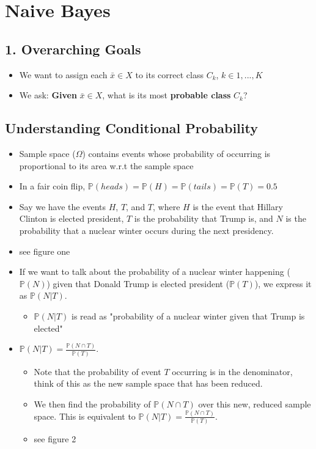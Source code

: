 \documentclass{article}
\author{Nelson Liu}
\date{\today}
\title{}
\begin{document}
\tableofcontents

\section{Naive Bayes}
\label{sec:orgheadline5}
\subsection{1. Overarching Goals}
\label{sec:orgheadline1}
\begin{itemize}
\item We want to assign each \(\bar{x} \in X\) to its correct class \(C_k\), \(k \in
  {1,...,K}\)
\item We ask: \textbf{Given} \(\bar{x} \in X\), what is its most \textbf{probable class} \(C_k\)?
\end{itemize}
\subsection{Understanding Conditional Probability}
\label{sec:orgheadline2}
\begin{itemize}
\item Sample space (\(\Omega\)) contains events whose probability of occurring is proportional to
its area w.r.t the sample space
\item In a fair coin flip, \(\mathbb{P}(heads) = \mathbb{P}(H) = \mathbb{P}(tails) = \mathbb{P}(T) = 0.5\)
\item Say we have the events \(H\), \(T\), and \(T\), where \(H\) is the event that Hillary
Clinton is elected president, \(T\) is the probability that Trump is, and \(N\) is
the probability that a nuclear winter occurs during the next presidency.
\item see figure one
\item If we want to talk about the probability of a nuclear winter happening
(\(\mathbb{P}(N)\)) given that Donald Trump is elected president
(\(\mathbb{P}(T)\)), we express it as \(\mathbb{P}(N|T)\).
\begin{itemize}
\item \(\mathbb{P}(N|T)\) is read as "probability of a nuclear winter given that Trump is
elected"
\end{itemize}
\item \(\mathbb{P}(N|T) = \frac{\mathbb{P}(N \cap T)}{\mathbb{P}(T)}\).
\begin{itemize}
\item Note that the probability of event \(T\) occurring is in the denominator,
think of this as the new sample space that has been reduced.
\item We then find the probability of \(\mathbb{P}(N \cap T)\) over this new, reduced sample
space. This is equivalent to \(\mathbb{P}(N|T) = \frac{\mathbb{P}(N \cap T)}{\mathbb{P}(T)}\).
\item see figure 2
\end{itemize}
\end{itemize}
\end{document}
